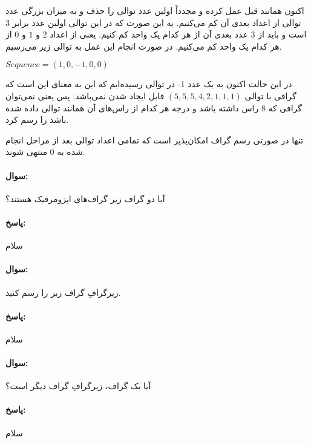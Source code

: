\documentclass[a4paper,10pt]{article}
\begin{document}
    اکنون همانند قبل عمل کرده و مجدداً اولین عدد توالی را حذف و به میزان بزرگی عدد توالی از اعداد بعدی آن کم می‌‌کنیم. به این صورت که در این توالی اولین عدد برابر $3$ است و باید از 3 عدد بعدی آن از هر کدام یک واحد کم کنیم. یعنی از اعداد $2$ و $1$ و $0$ از هر کدام یک واحد کم می‌‌کنیم.
    در صورت انجام این عمل به توالی زیر می‌رسیم.

    \begin{center}
        
        $Sequence = (1,0,-1,0,0)$

    \end{center}

    در این حالت اکنون به یک عدد 1- در توالی رسیده‌ایم که این به معنای این است که گرافی با توالی $(5,5,5,4,2,1,1,1)$ قابل ایجاد شدن نمی‌باشد. پس یعنی نمی‌توان گرافی که 8 راس داشته باشد و درجه هر کدام از راس‌های آن همانند توالی داده شده باشد را رسم کرد.

    تنها در صورتی رسم گراف امکان‌پذیر است که تمامی اعداد توالی بعد از مراحل انجام شده به $0$ منتهی شوند.

    \noindent\hrulefill

    \paragraph{سوال:} آیا دو گراف زیر گراف‌های ایزومرفیک هستند؟

    \paragraph{پاسخ:} سلام

    \noindent\hrulefill

    \paragraph{سوال:} زیرگرافِ گراف زیر را رسم کنید.

    \paragraph{پاسخ:} سلام

    \noindent\hrulefill

    \paragraph{سوال:} آیا یک گراف، زیرگرافِ گراف دیگر است؟
 
    \paragraph{پاسخ:} سلام
\end{document}
